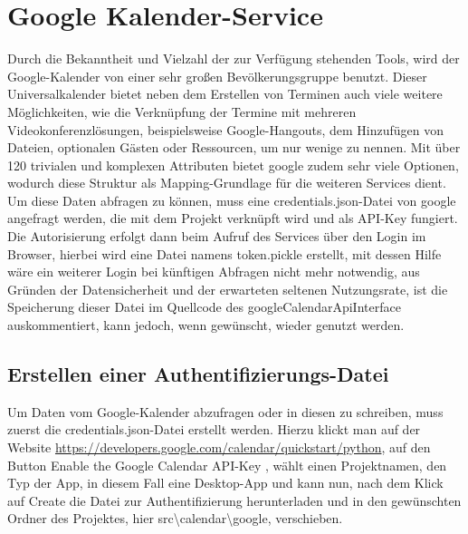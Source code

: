 \section{Google Kalender-Service}
Durch die Bekanntheit und Vielzahl der zur Verfügung stehenden Tools, wird der Google-Kalender von einer sehr großen Bevölkerungsgruppe benutzt. Dieser Universalkalender bietet neben dem Erstellen von Terminen auch viele weitere Möglichkeiten, wie die Verknüpfung der Termine mit mehreren Videokonferenzlösungen, beispielsweise Google-Hangouts, dem Hinzufügen von Dateien, optionalen Gästen oder Ressourcen, um nur wenige zu nennen. Mit über 120 trivialen und komplexen Attributen bietet google zudem sehr viele Optionen, wodurch diese Struktur als Mapping-Grundlage für die weiteren Services dient. Um diese Daten abfragen zu können, muss eine credentials.json-Datei von google angefragt werden, die mit dem Projekt verknüpft wird und als API-Key fungiert. Die Autorisierung erfolgt dann beim Aufruf des Services über den Login im Browser, hierbei wird eine Datei namens token.pickle erstellt, mit dessen Hilfe wäre ein weiterer Login bei künftigen Abfragen nicht mehr notwendig, aus Gründen der Datensicherheit und der erwarteten seltenen Nutzungsrate, ist die Speicherung dieser Datei im Quellcode des googleCalendarApiInterface auskommentiert, kann jedoch, wenn gewünscht, wieder genutzt werden.

\subsection{Erstellen einer Authentifizierungs-Datei}
Um Daten vom Google-Kalender abzufragen oder in diesen zu schreiben, muss zuerst die credentials.json-Datei erstellt werden. Hierzu klickt man auf der Website \url{https://developers.google.com/calendar/quickstart/python}, auf den Button \glqq Enable the Google Calendar API-Key \grqq, wählt einen Projektnamen, den Typ der App, in diesem Fall eine Desktop-App und kann nun, nach dem Klick auf \glqq Create \grqq die Datei zur Authentifizierung herunterladen und in den gewünschten Ordner des Projektes, hier src\textbackslash calendar\textbackslash google, verschieben.

